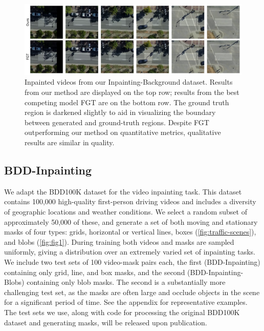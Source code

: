 \begin{figure}[t]
\centering
\includegraphics[width=\linewidth]{figures/bg_3119.pdf}
\caption{Inpainted videos from our Inpainting-Background dataset. Results from our method are displayed on the top row; results from the best competing model FGT \cite{fgt} are on the bottom row. The ground truth region is darkened slightly to aid in visualizing the boundary between generated and ground-truth regions. Despite FGT outperforming our method on quantitative metrics, qualitative results are similar in quality.}
\label{fig:background}
\end{figure}
\subsection{BDD-Inpainting}
We adapt the BDD100K \cite{bdd100k} dataset for the video inpainting task. This dataset contains 100,000 high-quality first-person driving videos and includes a diversity of geographic locations and weather conditions. We select a random subset of approximately 50,000 
of these, and generate a set of both moving and stationary masks of four types: grids, horizontal or vertical lines, boxes (\cref{fig:traffic-scenes}), and blobs (\cref{fig:fig1}). During training both videos and masks are sampled uniformly, giving a distribution over an extremely varied set of inpainting tasks. We include two test sets of 100 video-mask pairs each, the first (BDD-Inpainting) containing only grid, line, and box masks, and the second (BDD-Inpainting-Blobs) containing only blob masks. The second is a substantially more challenging test set, as the masks are often large and occlude objects in the scene for a significant period of time. See the appendix for representative examples. The test sets we use, along with code for processing the original BDD100K dataset and generating masks, will be released upon publication. 
